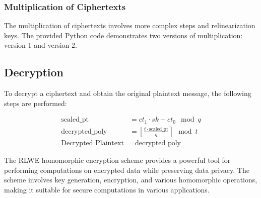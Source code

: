 \hypertarget{multiplication-of-ciphertexts}{%
\subsubsection{Multiplication of
Ciphertexts}\label{multiplication-of-ciphertexts}}

The multiplication of ciphertexts involves more complex steps and
relinearization keys. The provided Python code demonstrates two versions
of multiplication: version 1 and version 2.

\hypertarget{decryption}{%
\subsection{Decryption}\label{decryption}}

To decrypt a ciphertext and obtain the original plaintext message, the
following steps are performed:

\[
\begin{align*}
\text{scaled\_pt} &= ct_1 \cdot sk + ct_0 \mod q \\
\text{decrypted\_poly} &= \left\lfloor \frac{t \cdot \text{scaled\_pt}}{q} \right\rceil \mod t \\
\text{Decrypted Plaintext} &= \text{decrypted\_poly}
\end{align*}
\]

The RLWE homomorphic encryption scheme provides a powerful tool for
performing computations on encrypted data while preserving data privacy.
The scheme involves key generation, encryption, and various homomorphic
operations, making it suitable for secure computations in various
applications.
